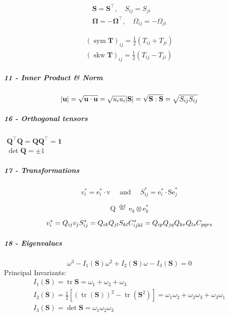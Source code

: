 \[\begin{array}{c}{\mathbf{S}=\mathbf{S}^{\top}, \quad S_{i j}=S_{j i}} \\ {\mathbf{\Omega}=-\mathbf{\Omega}^{\top}, \quad \Omega_{i j}=-\Omega_{j i}}\end{array}\]

\[\begin{array}{l}{(\operatorname{sym} \mathbf{T})_{i j}=\frac{1}{2}\left(T_{i j}+T_{j i}\right)} \\ {(\operatorname{skw} \mathbf{T})_{i j}=\frac{1}{2}\left(T_{i j}-T_{j i}\right)}\end{array}\]

\hypertarget{inner-product-norm}{%
\subparagraph{11 - Inner Product \& Norm}\label{inner-product-norm}}

\[|\mathbf{u}|=\sqrt{\mathbf{u} \cdot \mathbf{u}}=\sqrt{u_{i} u_{i}}\\|\mathbf{S}|=\sqrt{\mathbf{S}: \mathbf{S}}=\sqrt{S_{i j} S_{i j}}\]

\hypertarget{orthogonal-tensors}{%
\subparagraph{16 - Orthogonal tensors}\label{orthogonal-tensors}}

\(\begin{array}{c}{\mathbf{Q}^{\top} \mathbf{Q}=\mathbf{Q} \mathbf{Q}^{\top}=\mathbf{1}} \\ {\operatorname{det} \mathbf{Q}=\pm 1}\end{array}\)

\hypertarget{transformations}{%
\subparagraph{17 - Transformations}\label{transformations}}

\[v_{i}^{*}=\mathrm{e}_{i}^{*} \cdot \mathrm{v} \quad \text { and } \quad S_{i j}^{*}=\mathrm{e}_{i}^{*} \cdot \mathrm{Se}_{j}^{*}\]

\[\mathrm{Q} \stackrel{\text { def }}{=}  \mathrm{e}_{k} \otimes \mathrm{e}_{k}^{*}\]

\[v_{i}^{*}=Q_{i j} v_{j}\\S_{i j}^{*}=Q_{i k} Q_{j l} S_{k l}
\\C_{i j k l}^{*}=Q_{i p} Q_{j q} Q_{k r} Q_{l s} C_{p q r s}
\]

\hypertarget{eigenvalues}{%
\subparagraph{18 - Eigenvalues}\label{eigenvalues}}

\[\omega^{3}-I_{1}(\mathbf{S}) \omega^{2}+I_{2}(\mathbf{S}) \omega-I_{3}(\mathbf{S})=0\]
Principal Invariants:
\[\begin{array}{l}{I_{1}(\mathbf{S})=\operatorname{tr} \mathbf{S}}  = \omega_1 + \omega_2 + \omega_3 \\ {I_{2}(\mathbf{S})=\frac{1}{2}\left[(\operatorname{tr}(\mathbf{S}))^{2}-\operatorname{tr}\left(\mathbf{S}^{2}\right)\right]}  = \omega_1 \omega_2 + \omega_2 \omega_3+ \omega_3 \omega_1 \\ {I_{3}(\mathbf{S})=\operatorname{det} \mathbf{S}} = \omega_1 \omega_2 \omega_3 \end{array}\]

